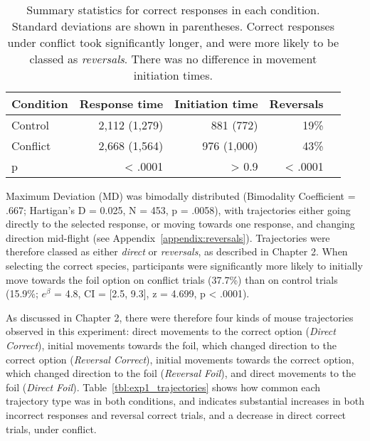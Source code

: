 \begin{table}
  \centering
  \begin{tabular}{lrrrr}
    \toprule
    Condition & Response time & Initiation time & Reversals\\
    \midrule
    Control   & 2,112 (1,279) & 881 (772)       & 19\%\\
    Conflict  & 2,668 (1,564) & 976 (1,000)     & 43\%\\
    \midrule
    p         & < .0001      & > 0.9           & < .0001\\
    \bottomrule
  \end{tabular}
  \caption[Descriptive statistics for correct responses, Experiment 1.]{
    Summary statistics for correct responses in each condition.
    Standard deviations are shown in parentheses.
    Correct responses under conflict took significantly longer,
    and were more likely to be classed as \emph{reversals}.
    There was no difference in movement initiation times.
    }
\end{table}



Maximum Deviation (MD) %
was bimodally distributed
(Bimodality Coefficient = .667;
Hartigan's D = 0.025, N = 453, p = .0058),
with trajectories either going directly to the selected response,
or moving towards one response, and changing direction mid-flight
(see Appendix~\ref{appendix:reversals}).
Trajectories were therefore classed as either \emph{direct} or \emph{reversals},
as described in Chapter 2.
When selecting the correct species,
participants were significantly more likely
to initially move towards the foil option
on conflict trials (37.7\%)
than on control trials (15.9\%;
$e^{\beta}$ = 4.8, CI = [2.5, 9.3], z = 4.699, p < .0001).

As discussed in Chapter 2,
there were therefore four kinds of mouse trajectories
observed in this experiment:
direct movements to the correct option (\emph{Direct Correct}),
initial movements towards the foil, which changed direction
to the correct option (\emph{Reversal Correct}),
initial movements towards the correct option, which changed direction
to the foil (\emph{Reversal Foil}),
and direct movements  to the foil (\emph{Direct Foil}).
Table~\ref{tbl:exp1_trajectories} shows how common
each trajectory type was in both conditions,
and indicates substantial increases in both incorrect responses
and reversal correct trials,
and a decrease in direct correct trials, under conflict.

